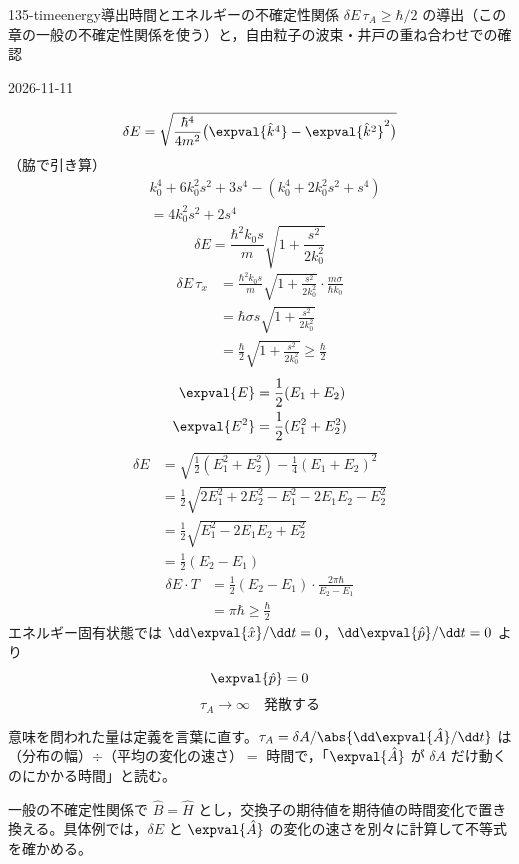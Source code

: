 \documentclass[uplatex,dvipdfmx,a4paper,11pt]{jsarticle}
\begin{document}
\begin{mondai}{135-timeenergy}{導出}{時間とエネルギーの不確定性関係 $\delta E\,\tau_{A}\ge\hbar/2$ の導出（この章の一般の不確定性関係を使う）と，自由粒子の波束・井戸の重ね合わせでの確認}
\begin{kotaeutsushi}{2026-11-11}
\begin{align*}
\end{align*}
\[ \delta E=\sqrt{\frac{\hbar^{4}}{4m^{2}}\bigl(\expval{\hat{k}^{4}}-\expval{\hat{k}^{2}}^{2}\bigr)} \]
（脇で引き算）
\begin{align*}
&k_{0}^{4}+6k_{0}^{2}s^{2}+3s^{4}-(k_{0}^{4}+2k_{0}^{2}s^{2}+s^{4})\\
&=4k_{0}^{2}s^{2}+2s^{4}
\end{align*}
\[ \delta E=\frac{\hbar^{2}k_{0}s}{m}\sqrt{1+\frac{s^{2}}{2k_{0}^{2}}} \]
\begin{align*}
\delta E\,\tau_{x}&=\frac{\hbar^{2}k_{0}s}{m}\sqrt{1+\frac{s^{2}}{2k_{0}^{2}}}\cdot\frac{m\sigma}{\hbar k_{0}}\\
&=\hbar\sigma s\sqrt{1+\frac{s^{2}}{2k_{0}^{2}}}\\
&=\frac{\hbar}{2}\sqrt{1+\frac{s^{2}}{2k_{0}^{2}}}\ge\frac{\hbar}{2}
\end{align*}
\begin{align*}
\expval{E}&=\frac{1}{2}(E_{1}+E_{2})\\
\expval{E^{2}}&=\frac{1}{2}(E_{1}^{2}+E_{2}^{2})
\end{align*}
\begin{align*}
\delta E&=\sqrt{\frac{1}{2}(E_{1}^{2}+E_{2}^{2})-\frac{1}{4}(E_{1}+E_{2})^{2}}\\
&=\frac{1}{2}\sqrt{2E_{1}^{2}+2E_{2}^{2}-E_{1}^{2}-2E_{1}E_{2}-E_{2}^{2}}\\
&=\frac{1}{2}\sqrt{E_{1}^{2}-2E_{1}E_{2}+E_{2}^{2}}\\
&=\frac{1}{2}(E_{2}-E_{1})
\end{align*}
\begin{align*}
\delta E\cdot T&=\frac{1}{2}(E_{2}-E_{1})\cdot\frac{2\pi\hbar}{E_{2}-E_{1}}\\
&=\pi\hbar\ge\frac{\hbar}{2}
\end{align*}
エネルギー固有状態では $\dd\expval{\hat{x}}/\dd t=0$，$\dd\expval{\hat{p}}/\dd t=0$ より
\[ \expval{\hat{p}}=0 \]
\[ \tau_{A}\to\infty\quad\text{発散する} \]
\end{kotaeutsushi}
\begin{kizuki}
\item 意味を問われた量は定義を言葉に直す。$\tau_{A}=\delta A/\abs{\dd\expval{\hat{A}}/\dd t}$ は（分布の幅）$\div$（平均の変化の速さ）$=$ 時間で，「$\expval{\hat{A}}$ が $\delta A$ だけ動くのにかかる時間」と読む。
\end{kizuki}
\begin{tadashii}
\houshin 一般の不確定性関係で $\hat{B}=\hat{H}$ とし，交換子の期待値を期待値の時間変化で置き換える。具体例では，$\delta E$ と $\expval{\hat{A}}$ の変化の速さを別々に計算して不等式を確かめる。

\end{tadashii}
\end{mondai}
\end{document}

